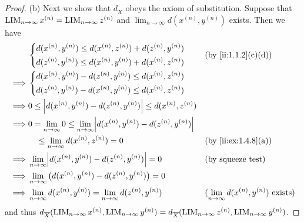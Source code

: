 \begin{proof}{(b)}
  Next we show that \(d_{\overline{X}}\) obeys the axiom of substitution.
  Suppose that \(\operatorname*{LIM}_{n \to \infty} x^{(n)} = \operatorname*{LIM}_{n \to \infty} z^{(n)}\) and \(\lim_{n \to \infty} d(x^{(n)}, y^{(n)})\) exists.
  Then we have
  \begin{align*}
             & \begin{dcases}
                 d(x^{(n)}, y^{(n)}) \leq d(x^{(n)}, z^{(n)}) + d(z^{(n)}, y^{(n)}) \\
                 d(z^{(n)}, y^{(n)}) \leq d(x^{(n)}, y^{(n)}) + d(x^{(n)}, z^{(n)})
               \end{dcases}                              &  & \by{ii:1.1.2}[c,d]                                                                                                  \\
    \implies & \begin{dcases}
                 d(x^{(n)}, y^{(n)}) - d(z^{(n)}, y^{(n)}) \leq d(x^{(n)}, z^{(n)}) \\
                 d(z^{(n)}, y^{(n)}) - d(x^{(n)}, y^{(n)}) \leq d(x^{(n)}, z^{(n)})
               \end{dcases}                                                                                                  \\
    \implies & 0 \leq \abs{d(x^{(n)}, y^{(n)}) - d(z^{(n)}, y^{(n)})} \leq d(x^{(n)}, z^{(n)})                                                                                     \\
    \implies & 0 = \lim_{n \to \infty} 0 \leq \lim_{n \to \infty} \abs{d(x^{(n)}, y^{(n)}) - d(z^{(n)}, y^{(n)})}                                                                  \\
             & \quad \leq \lim_{n \to \infty} d(x^{(n)}, z^{(n)}) = 0                                             &  & \by{ii:ex:1.4.8}[a]                                         \\
    \implies & \lim_{n \to \infty} \abs{d(x^{(n)}, y^{(n)}) - d(z^{(n)}, y^{(n)})} = 0                            &  & \text{(by squeeze test)}                                    \\
    \implies & \lim_{n \to \infty} \big(d(x^{(n)}, y^{(n)}) - d(z^{(n)}, y^{(n)})\big) = 0                                                                                         \\
    \implies & \lim_{n \to \infty} d(x^{(n)}, y^{(n)}) = \lim_{n \to \infty} d(z^{(n)}, y^{(n)})                  &  & \text{(\(\lim_{n \to \infty} d(x^{(n)}, y^{(n)})\) exists)}
  \end{align*}
  and thus \(d_{\overline{X}}(\operatorname*{LIM}_{n \to \infty} x^{(n)}, \operatorname*{LIM}_{n \to \infty} y^{(n)}) = d_{\overline{X}}(\operatorname*{LIM}_{n \to \infty} z^{(n)}, \operatorname*{LIM}_{n \to \infty} y^{(n)})\).


\end{proof}
